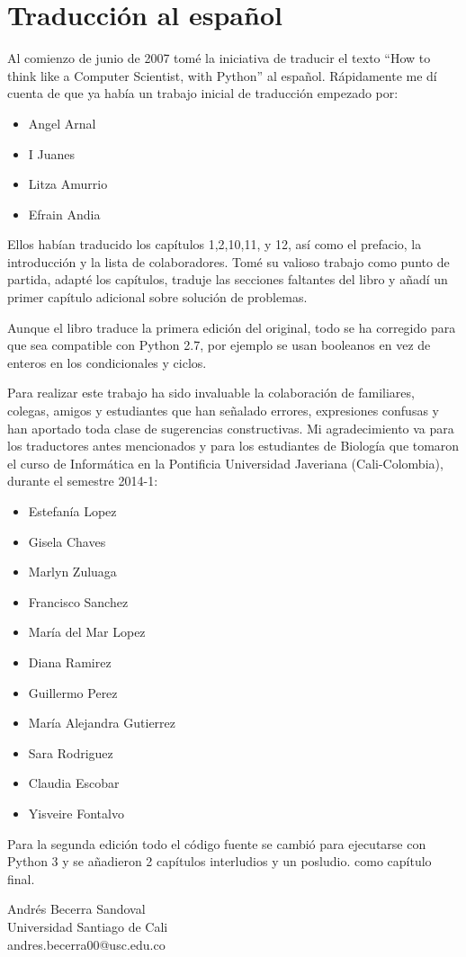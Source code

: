 
\chapter{Traducción al español}

Al comienzo de junio de 2007 tomé la iniciativa de traducir el texto
``How to think like a Computer Scientist, with Python'' al español.
Rápidamente me dí cuenta de que ya había un trabajo inicial de traducción
empezado por:
\begin{itemize}
\item Angel Arnal 
\item I Juanes 
\item Litza Amurrio 
\item Efrain Andia
\end{itemize}
Ellos habían traducido los capítulos 1,2,10,11, y 12, así como el
prefacio, la introducción y la lista de colaboradores. Tomé su valioso
trabajo como punto de partida, adapté los capítulos, traduje las secciones
faltantes del libro y añadí un primer capítulo adicional sobre solución
de problemas.

Aunque el libro traduce la primera edición del original, todo se ha
corregido para que sea compatible con Python 2.7, por ejemplo se usan
booleanos en vez de enteros en los condicionales y ciclos.

Para realizar este trabajo ha sido invaluable la colaboración de familiares,
colegas, amigos y estudiantes que han señalado errores, expresiones
confusas y han aportado toda clase de sugerencias constructivas. Mi
agradecimiento va para los traductores antes mencionados y para los
estudiantes de Biología que tomaron el curso de Informática en la
Pontificia Universidad Javeriana (Cali-Colombia), durante el semestre
2014-1:
\begin{itemize}
\item Estefanía Lopez 
\item Gisela Chaves 
\item Marlyn Zuluaga 
\item Francisco Sanchez 
\item María del Mar Lopez 
\item Diana Ramirez 
\item Guillermo Perez 
\item María Alejandra Gutierrez 
\item Sara Rodriguez 
\item Claudia Escobar
\item Yisveire Fontalvo
\end{itemize}
\vspace{0.25in}
 

Para la segunda edición todo el código fuente se cambió para ejecutarse
con Python 3 y se añadieron 2 capítulos interludios y un posludio.
como capítulo final.
\begin{flushleft}
Andrés Becerra Sandoval \\
 Universidad Santiago de Cali \\
 andres.becerra00@usc.edu.co \\
\par\end{flushleft}
